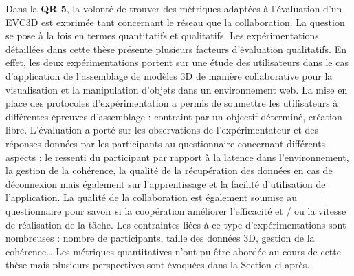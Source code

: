 %
Dans la \textbf{QR 5}, la volonté de trouver des métriques adaptées à l'évaluation 
d'un \gls{EVC3D} est exprimée tant concernant le réseau que la collaboration. La 
question se pose à la fois en termes quantitatifs et qualitatifs.
Les expérimentations détaillées dans cette thèse présente plusieurs facteurs 
d'évaluation qualitatifs. En effet, les deux expérimentations portent sur une étude 
des utilisateurs dans le cas d'application de l'assemblage de modèles 3D de 
manière collaborative pour la visualisation et la manipulation d'objets dans un 
environnement web.
La mise en place des protocoles d'expérimentation a permis de soumettre les 
utilisateurs à différentes épreuves d'assemblage : contraint par un objectif 
déterminé, création libre. 
L'évaluation a porté sur les observations de l'expérimentateur et des réponses 
données par les participants au questionnaire concernant différents aspects : le 
ressenti du participant par rapport à la latence dans l'environnement, la gestion de 
la cohérence, la qualité de la récupération des données en cas de déconnexion 
mais également sur l'apprentissage et la facilité d'utilisation de l'application. La 
qualité de la collaboration est également soumise au questionnaire pour savoir si 
la coopération améliorer l'efficacité et / ou la vitesse de réalisation de la tâche.
Les contraintes liées à ce type d'expérimentations sont nombreuses : nombre de 
participants, taille des données 3D, gestion de la cohérence\dots 
Les métriques quantitatives n'ont pu être abordée au cours de cette thèse mais 
plusieurs perspectives sont évoquées dans la Section  ci-après.

%
%
%
%
%
%
%


